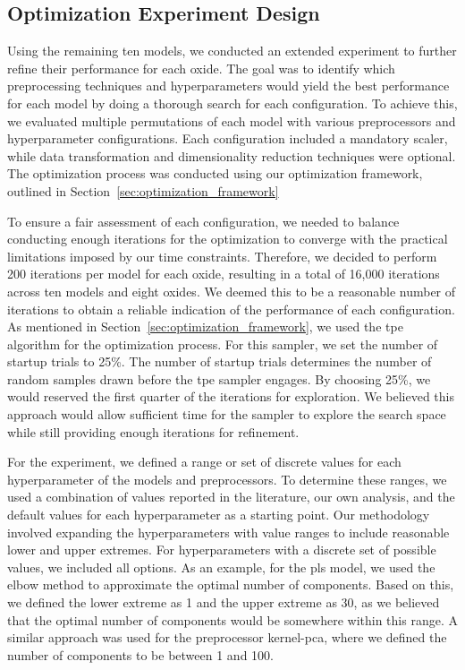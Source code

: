 \subsection{Optimization Experiment Design}\label{subsec:optimization_experiment_design}
Using the remaining ten models, we conducted an extended experiment to further refine their performance for each oxide. 
The goal was to identify which preprocessing techniques and hyperparameters would yield the best performance for each model by doing a thorough search for each configuration. 
To achieve this, we evaluated multiple permutations of each model with various preprocessors and hyperparameter configurations. 
Each configuration included a mandatory scaler, while data transformation and dimensionality reduction techniques were optional. 
The optimization process was conducted using our optimization framework, outlined in Section~\ref{sec:optimization_framework}

To ensure a fair assessment of each configuration, we needed to balance conducting enough iterations for the optimization to converge with the practical limitations imposed by our time constraints.
Therefore, we decided to perform 200 iterations per model for each oxide, resulting in a total of 16,000 iterations across ten models and eight oxides.
We deemed this to be a reasonable number of iterations to obtain a reliable indication of the performance of each configuration.
As mentioned in Section~\ref{sec:optimization_framework}, we used the \gls{tpe} algorithm for the optimization process.
For this sampler, we set the number of startup trials to 25\%.
The number of startup trials determines the number of random samples drawn before the \gls{tpe} sampler engages.
By choosing 25\%, we would reserved the first quarter of the iterations for exploration.
We believed this approach would allow sufficient time for the sampler to explore the search space while still providing enough iterations for refinement.

For the experiment, we defined a range or set of discrete values for each hyperparameter of the models and preprocessors.
To determine these ranges, we used a combination of values reported in the literature, our own analysis, and the default values for each hyperparameter as a starting point.
Our methodology involved expanding the hyperparameters with value ranges to include reasonable lower and upper extremes.
For hyperparameters with a discrete set of possible values, we included all options. 
As an example, for the \gls{pls} model, we used the elbow method to approximate the optimal number of components. 
Based on this, we defined the lower extreme as 1 and the upper extreme as 30, as we believed that the optimal number of components would be somewhere within this range. 
A similar approach was used for the preprocessor \gls{kernel-pca}, where we defined the number of components to be between 1 and 100.

